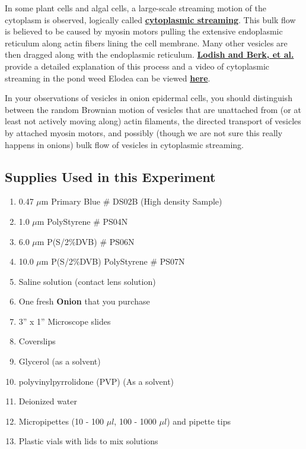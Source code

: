 \documentclass{../lab}
\begin{document}
In some plant cells and algal cells, a large-scale streaming motion of the cytoplasm is observed, logically called \href{http://physics111.lib.berkeley.edu/Physics111/Reprints/OTZ/biowikipedia.pdf}{\textbf{cytoplasmic streaming}}. This bulk flow is believed to be caused by myosin motors pulling the extensive endoplasmic reticulum along actin fibers lining the cell membrane. Many other vesicles are then dragged along with the endoplasmic reticulum. \href{http://experimentationlab.berkeley.edu/sites/default/files/Lodish_and_Berk_Figure_18-40.pdf}{\textbf{Lodish and Berk, et al.}} provide a detailed explanation of this process and a video of cytoplasmic streaming in the pond weed Elodea can be viewed \href{http://experimentationlab.berkeley.edu/sites/default/files/Cytoplasmic_Streaming_Elodea.mov}{\textbf{here}}.

In your observations of vesicles in onion epidermal cells, you should distinguish between the random Brownian motion of vesicles that are unattached from (or at least not actively moving along) actin filaments, the directed transport of vesicles by attached myosin motors, and possibly (though we are not sure this really happens in onions) bulk flow of vesicles in cytoplasmic streaming.

\subsection{Supplies Used in this Experiment}

\begin{enumerate}
    \item 0.47 $\mu$m Primary Blue \# DS02B (High density Sample)

    \item 1.0 $\mu$m PolyStyrene \# PS04N

    \item 6.0 $\mu$m P(S/2\%DVB) \# PS06N

    \item 10.0 $\mu$m P(S/2\%DVB) PolyStyrene \# PS07N

    \item Saline solution (contact lens solution)

    \item One fresh\textbf{ Onion} that you purchase

    \item 3'' x 1'' Microscope slides

    \item Coverslips

    \item Glycerol (as a solvent)

    \item polyvinylpyrrolidone (PVP) (As a solvent)

    \item Deionized water

    \item Micropipettes (10 - 100 $\mu l$, 100 - 1000 $\mu l$) and pipette tips

    \item Plastic vials with lids to mix solutions

\end{enumerate}
\end{document}

